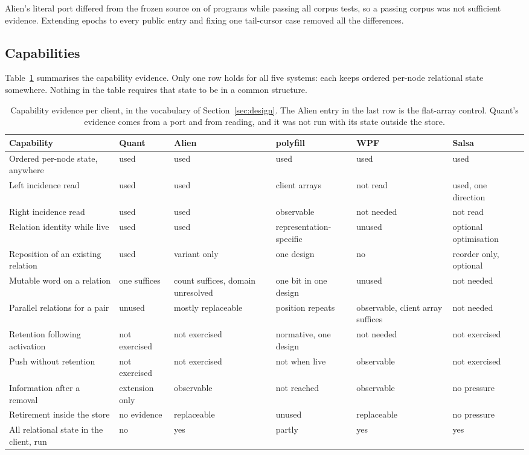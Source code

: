 \documentclass[11pt]{article}
\begin{document}
Alien's literal port differed from the frozen source on \alienPortDiffer{} of \alienPrograms{} programs while passing all \alienCorpus{} corpus tests, so a passing corpus was not sufficient evidence. Extending epochs to every public entry and fixing one tail-cursor case removed all the differences.

\subsection{Capabilities}

Table~\ref{tab:capabilities} summarises the capability evidence. Only one row holds for all five systems: each keeps ordered per-node relational state somewhere. Nothing in the table requires that state to be in a common structure.

\begin{table}[tbp]
\centering
\scriptsize
\begin{tabular}{p{3.1cm} p{2.1cm} p{2.1cm} p{2.3cm} p{2.1cm} p{2.1cm}}
\toprule
Capability & Quant & Alien & polyfill & WPF & Salsa \\
\midrule
Ordered per-node state, anywhere & used & used & used & used & used \\
Left incidence read & used & used & client arrays & not read & used, one direction \\
Right incidence read & used & used & observable & not needed & not read \\
Relation identity while live & used & used & representation-specific & unused & optional optimisation \\
Reposition of an existing relation & used & variant only & one design & no & reorder only, optional \\
Mutable word on a relation & one suffices & count suffices, domain unresolved & one bit in one design & unused & not needed \\
Parallel relations for a pair & unused & mostly replaceable & position repeats & observable, client array suffices & not needed \\
Retention following activation & not exercised & not exercised & normative, one design & not needed & not exercised \\
Push without retention & not exercised & not exercised & not when live & observable & not exercised \\
Information after a removal & extension only & observable & not reached & observable & no pressure \\
Retirement inside the store & no evidence & replaceable & unused & replaceable & no pressure \\
All relational state in the client, run & no & yes & partly & yes & yes \\
\bottomrule
\end{tabular}
\caption{Capability evidence per client, in the vocabulary of Section~\ref{sec:design}. The Alien entry in the last row is the flat-array control. Quant's evidence comes from a port and from reading, and it was not run with its state outside the store.}
\label{tab:capabilities}
\end{table}
\end{document}
